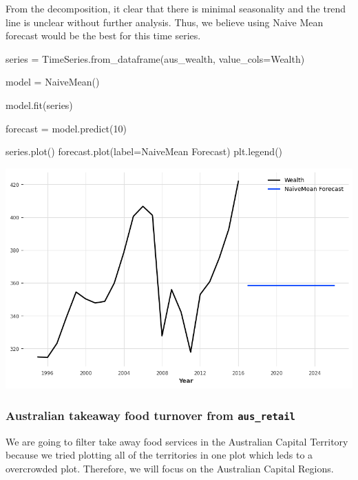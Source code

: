 \documentclass[
  11pt,
]{article}
\newenvironment{Shaded}{\begin{snugshade}}{\end{snugshade}}
\newcommand{\DecValTok}[1]{\textcolor[rgb]{0.68,0.00,0.00}{#1}}
\newcommand{\NormalTok}[1]{\textcolor[rgb]{0.00,0.23,0.31}{#1}}
\newcommand{\OperatorTok}[1]{\textcolor[rgb]{0.37,0.37,0.37}{#1}}
\newcommand{\StringTok}[1]{\textcolor[rgb]{0.13,0.47,0.30}{#1}}
\begin{document}
From the decomposition, it clear that there is minimal seasonality and
the trend line is unclear without further analysis. Thus, we believe
using Naive Mean forecast would be the best for this time series.

\begin{Shaded}
\begin{Highlighting}[]
\NormalTok{series }\OperatorTok{=}\NormalTok{ TimeSeries.from\_dataframe(aus\_wealth, value\_cols}\OperatorTok{=}\StringTok{\textquotesingle{}Wealth\textquotesingle{}}\NormalTok{)}

\NormalTok{model }\OperatorTok{=}\NormalTok{ NaiveMean()}

\NormalTok{model.fit(series)}

\NormalTok{forecast }\OperatorTok{=}\NormalTok{ model.predict(}\DecValTok{10}\NormalTok{)}

\NormalTok{series.plot()}
\NormalTok{forecast.plot(label}\OperatorTok{=}\StringTok{\textquotesingle{}NaiveMean Forecast\textquotesingle{}}\NormalTok{)}
\NormalTok{plt.legend()}
\end{Highlighting}
\end{Shaded}

\includegraphics{hw3_files/figure-pdf/cell-24-output-1.png}

\subsubsection{\texorpdfstring{Australian takeaway food turnover from
\texttt{aus\_retail}}{Australian takeaway food turnover from aus\_retail}}\label{australian-takeaway-food-turnover-from-aus_retail}

We are going to filter take away food services in the Australian Capital
Territory because we tried plotting all of the territories in one plot
which leds to a overcrowded plot. Therefore, we will focus on the
Australian Capital Regions.
\end{document}

